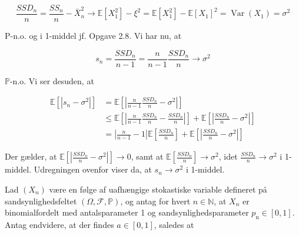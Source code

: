 \documentclass{Class}
\begin{document}
\begin{enumerate}
    $$
    \frac{S S D_n}{n}=\frac{S S_n}{n}-\bar{X}_n^2 \rightarrow \mathbb{E}\left[X_1^2\right]-\xi^2=\mathbb{E}\left[X_1^2\right]-\mathbb{E}\left[X_1\right]^2=\operatorname{Var}\left(X_1\right)=\sigma^2
    $$
    
    
    P-n.o. og i 1-middel jf. Opgave 2.8. Vi har nu, at
    
    $$
    s_n=\frac{S S D_n}{n-1}=\frac{n}{n-1} \frac{S S D_n}{n} \rightarrow \sigma^2
    $$
    
    $\mathbb{P}$-n.o. Vi ser desuden, at
    
    $$
    \begin{aligned}
    \mathbb{E}\left[\left|s_n-\sigma^2\right|\right] & =\mathbb{E}\left[\left|\frac{n}{n-1} \frac{S S D_n}{n}-\sigma^2\right|\right] \\
    & \leq \mathbb{E}\left[\left|\frac{n}{n-1} \frac{S S D_n}{n}-\frac{S S D_n}{n}\right|\right]+\mathbb{E}\left[\left|\frac{S S D_n}{n}-\sigma^2\right|\right] \\
    & =\left|\frac{n}{n-1}-1\right| \mathbb{E}\left[\frac{S S D_n}{n}\right]+\mathbb{E}\left[\left|\frac{S S D_n}{n}-\sigma^2\right|\right]
    \end{aligned}
    $$
    
    
    Der gælder, at $\mathbb{E}\left[\left|\frac{S S D_n}{n}-\sigma^2\right|\right] \rightarrow 0$, samt at $\mathbb{E}\left[\frac{S S D_n}{n}\right] \rightarrow \sigma^2$, idet $\frac{S S D_n}{n} \rightarrow \sigma^2$ i 1-middel. Udregningen ovenfor viser da, at $s_n \rightarrow \sigma^2$ i 1-middel.
\end{enumerate}
Lad $\left(X_n\right)$ være en følge af uafhængige stokastiske variable defineret på sandsynlighedsfeltet $(\Omega, \mathcal{F}, \mathbb{P})$, og antag for hvert $n \in \mathbb{N}$, at $X_n$ er binomialfordelt med antalsparameter 1 og sandsynlighedsparameter $p_{\mathrm{n}} \in[0,1]$. Antag endvidere, at der findes $a \in[0,1]$, saledes at
\end{document}
